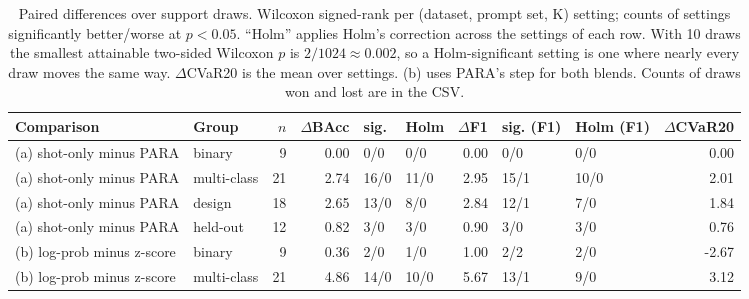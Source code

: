 \begin{table}[t]
\centering
\small
\caption{Paired differences over support draws. Wilcoxon signed-rank per (dataset, prompt set, K) setting; counts of settings significantly better/worse at $p<0.05$. ``Holm'' applies Holm's correction across the settings of each row. With 10 draws the smallest attainable two-sided Wilcoxon $p$ is $2/1024 \approx 0.002$, so a Holm-significant setting is one where nearly every draw moves the same way. $\Delta$CVaR20 is the mean over settings. (b) uses PARA's step for both blends. Counts of draws won and lost are in the CSV.}
\label{tab:T3_paired_tests}
\begin{adjustbox}{max width=\linewidth}
\begin{tabular}{llrrllrllr}
\toprule
Comparison & Group & $n$ & $\Delta$BAcc & sig. & Holm & $\Delta$F1 & sig. (F1) & Holm (F1) & $\Delta$CVaR20 \\
\midrule
(a) shot-only minus PARA & binary & 9 & 0.00 & 0/0 & 0/0 & 0.00 & 0/0 & 0/0 & 0.00 \\
(a) shot-only minus PARA & multi-class & 21 & 2.74 & 16/0 & 11/0 & 2.95 & 15/1 & 10/0 & 2.01 \\
(a) shot-only minus PARA & design & 18 & 2.65 & 13/0 & 8/0 & 2.84 & 12/1 & 7/0 & 1.84 \\
(a) shot-only minus PARA & held-out & 12 & 0.82 & 3/0 & 3/0 & 0.90 & 3/0 & 3/0 & 0.76 \\
(b) log-prob minus z-score & binary & 9 & 0.36 & 2/0 & 1/0 & 1.00 & 2/2 & 2/0 & -2.67 \\
(b) log-prob minus z-score & multi-class & 21 & 4.86 & 14/0 & 10/0 & 5.67 & 13/1 & 9/0 & 3.12 \\
\bottomrule
\end{tabular}
\end{adjustbox}
\end{table}
